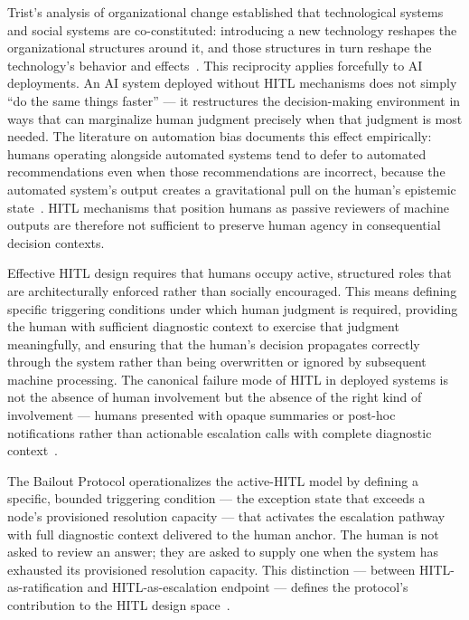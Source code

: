 Trist's analysis of organizational change established that technological systems and social systems are co-constituted: introducing a new technology reshapes the organizational structures around it, and those structures in turn reshape the technology's behavior and effects~\cite{tristr81}. This reciprocity applies forcefully to AI deployments. An AI system deployed without HITL mechanisms does not simply ``do the same things faster'' --- it restructures the decision-making environment in ways that can marginalize human judgment precisely when that judgment is most needed. The literature on automation bias documents this effect empirically: humans operating alongside automated systems tend to defer to automated recommendations even when those recommendations are incorrect, because the automated system's output creates a gravitational pull on the human's epistemic state~\cite{tristr81}. HITL mechanisms that position humans as passive reviewers of machine outputs are therefore not sufficient to preserve human agency in consequential decision contexts.

Effective HITL design requires that humans occupy active, structured roles that are architecturally enforced rather than socially encouraged. This means defining specific triggering conditions under which human judgment is required, providing the human with sufficient diagnostic context to exercise that judgment meaningfully, and ensuring that the human's decision propagates correctly through the system rather than being overwritten or ignored by subsequent machine processing. The canonical failure mode of HITL in deployed systems is not the absence of human involvement but the absence of the right kind of involvement --- humans presented with opaque summaries or post-hoc notifications rather than actionable escalation calls with complete diagnostic context~\cite{bansal2019}.

The Bailout Protocol operationalizes the active-HITL model by defining a specific, bounded triggering condition --- the exception state that exceeds a node's provisioned resolution capacity --- that activates the escalation pathway with full diagnostic context delivered to the human anchor. The human is not asked to review an answer; they are asked to supply one when the system has exhausted its provisioned resolution capacity. This distinction --- between HITL-as-ratification and HITL-as-escalation endpoint --- defines the protocol's contribution to the HITL design space~\cite{tristr81,bansal2019}.

